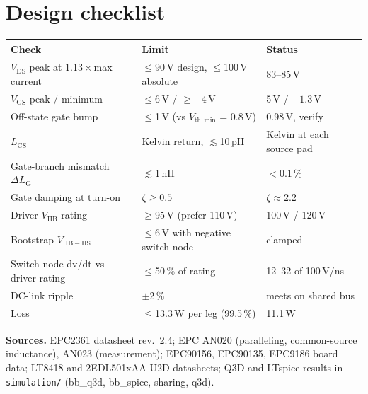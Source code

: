 ﻿\documentclass[10pt,a4paper]{article}
\begin{document}
\section{Design checklist}
\begin{center}\small
\begin{tabular}{@{}L{6.2cm}L{4.6cm}L{3.6cm}@{}}\toprule
Check & Limit & Status \\\midrule
$V_\mathrm{DS}$ peak at 1.13\,$\times$\,max current & $\leq$90\,V design, $\leq$100\,V absolute & 83--85\,V \\
$V_\mathrm{GS}$ peak / minimum & $\leq$6\,V / $\geq-4$\,V & 5\,V / $-1.3$\,V \\
Off-state gate bump & $\leq$1\,V (vs $V_\mathrm{th,min}$ = 0.8\,V) & 0.98\,V, verify \\
$L_\mathrm{CS}$ & Kelvin return, $\lesssim$10\,pH & Kelvin at each source pad \\
Gate-branch mismatch $\Delta L_\mathrm{G}$ & $\lesssim$1\,nH & $<$0.1\,\% \\
Gate damping at turn-on & $\zeta\geq0.5$ & $\zeta\approx2.2$ \\
Driver $V_\mathrm{HB}$ rating & $\geq$95\,V (prefer 110\,V) & 100\,V / 120\,V \\
Bootstrap $V_\mathrm{HB-HS}$ & $\leq$6\,V with negative switch node & clamped \\
Switch-node dv/dt vs driver rating & $\leq$50\,\% of rating & 12--32 of 100\,V/ns \\
DC-link ripple & $\pm$2\,\% & meets on shared bus \\
Loss & $\leq$13.3\,W per leg (99.5\,\%) & 11.1\,W \\
\bottomrule\end{tabular}\end{center}

\textbf{Sources.} EPC2361 datasheet rev.~2.4; EPC AN020 (paralleling, common-source inductance), AN023 (measurement); EPC90156, EPC90135, EPC9186 board data; LT8418 and 2EDL501xAA-U2D datasheets; Q3D and LTspice results in \texttt{simulation/} (bb\_q3d, bb\_spice, sharing, q3d).
\end{document}

